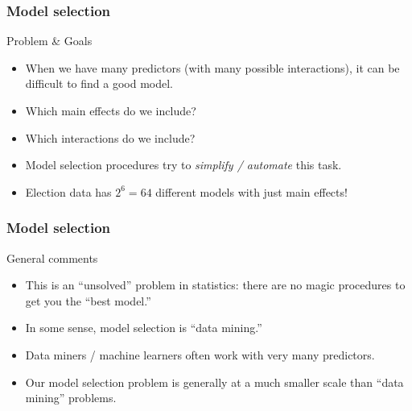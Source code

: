 \documentclass[handout]{beamer}
\begin{document}
   \begin{frame} \frametitle{Model selection}

   \begin{block}
   {Problem \& Goals}
   \begin{itemize}
   \item When we have many predictors (with many possible interactions), it can be difficult to find a good model.
   \item Which main effects do we include?
   \item Which interactions do we include?

   \item Model selection procedures try to {\em simplify / automate} this task.

   \item Election data has  $2^6=64$ different models with just main effects!
   \end{itemize}
   \end{block}
   \end{frame}


   \begin{frame} \frametitle{Model selection}

   \begin{block}
   {General comments}
   \begin{itemize}

   \item This is an ``unsolved'' problem in statistics: there are no magic procedures to get you the ``best model.''
   \item In some sense, model selection is ``data mining.''

   \item Data miners / machine learners often work with very many predictors.

   \item Our model selection problem is generally at a much smaller scale than ``data mining'' problems.

   \end{itemize}
   \end{block}
   \end{frame}

\end{document}
